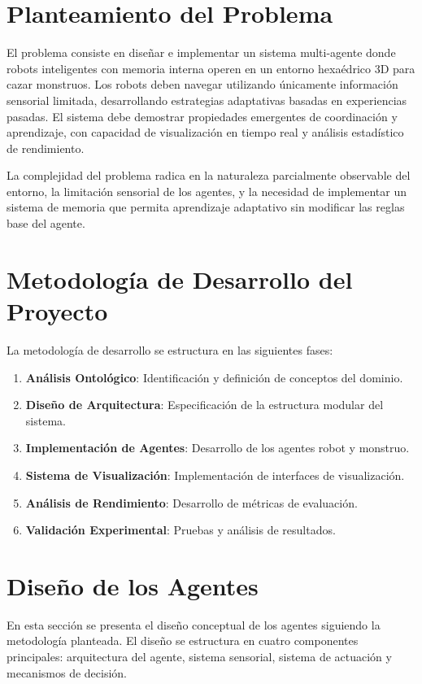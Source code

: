 \documentclass[10pt,twocolumn]{article}
\begin{document}
\section{Planteamiento del Problema}

El problema consiste en diseñar e implementar un sistema multi-agente donde robots inteligentes con memoria interna operen en un entorno hexaédrico 3D para cazar monstruos. Los robots deben navegar utilizando únicamente información sensorial limitada, desarrollando estrategias adaptativas basadas en experiencias pasadas. El sistema debe demostrar propiedades emergentes de coordinación y aprendizaje, con capacidad de visualización en tiempo real y análisis estadístico de rendimiento.

La complejidad del problema radica en la naturaleza parcialmente observable del entorno, la limitación sensorial de los agentes, y la necesidad de implementar un sistema de memoria que permita aprendizaje adaptativo sin modificar las reglas base del agente.

\section{Metodología de Desarrollo del Proyecto}

La metodología de desarrollo se estructura en las siguientes fases:

\begin{enumerate}
\item \textbf{Análisis Ontológico}: Identificación y definición de conceptos del dominio.
\item \textbf{Diseño de Arquitectura}: Especificación de la estructura modular del sistema.
\item \textbf{Implementación de Agentes}: Desarrollo de los agentes robot y monstruo.
\item \textbf{Sistema de Visualización}: Implementación de interfaces de visualización.
\item \textbf{Análisis de Rendimiento}: Desarrollo de métricas de evaluación.
\item \textbf{Validación Experimental}: Pruebas y análisis de resultados.
\end{enumerate}

\section{Diseño de los Agentes}

En esta sección se presenta el diseño conceptual de los agentes siguiendo la metodología planteada. El diseño se estructura en cuatro componentes principales: arquitectura del agente, sistema sensorial, sistema de actuación y mecanismos de decisión.
\end{document}
